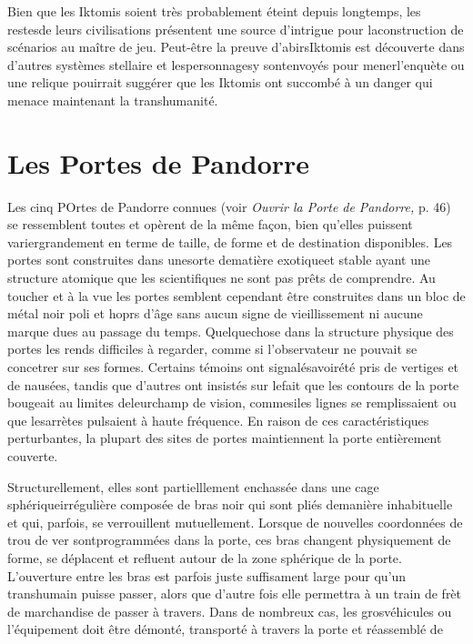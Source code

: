 Bien que les Iktomis soient très probablement éteint depuis longtemps, les restesde leurs civilisations présentent une source d'intrigue pour laconstruction de scénarios au maître de jeu. Peut-être la preuve d'abirsIktomis est découverte dans d'autres systèmes stellaire et lespersonnagesy sontenvoyés pour menerl'enquète ou une relique pouirrait suggérer que les Iktomis ont succombé à un danger qui menace maintenant la transhumanité. 

\section{Les Portes de Pandorre} 

Les cinq POrtes de Pandorre connues (voir \textit{Ouvrir la Porte de } \textit{Pandorre,} p. 46) se ressemblent toutes et opèrent de la même façon, bien qu'elles puissent variergrandement en terme de taille, de forme et de destination disponibles. Les portes sont construites dans unesorte dematière exotiqueet stable ayant une structure atomique que les scientifiques ne sont pas prêts de comprendre. Au toucher et à la vue les portes semblent cependant être construites dans un bloc de métal noir poli et hoprs d'âge sans aucun signe de vieillissement ni aucune marque dues au passage du temps. Quelquechose dans la structure physique des portes les rends difficiles à regarder, comme si l'observateur ne pouvait se concetrer sur ses formes. Certains témoins ont signalésavoirété pris de vertiges et de nausées, tandis que d'autres ont insistés sur lefait que les contours de la porte bougeait au limites deleurchamp de vision, commesiles lignes se remplissaient ou que lesarrètes pulsaient à haute fréquence. En raison de ces caractéristiques perturbantes, la plupart des sites de portes maintiennent la porte entièrement couverte. 

Structurellement, elles sont partielllement enchassée dans une cage sphériqueirrégulière composée de bras noir qui sont pliés demanière inhabituelle et qui, parfois, se verrouillent mutuellement. Lorsque de nouvelles coordonnées de trou de ver sontprogrammées dans la porte, ces bras changent physiquement de forme, se déplacent et refluent autour de la zone sphérique de la porte. L'ouverture entre les bras est parfois juste suffisament large pour qu'un transhumain puisse passer, alors que d'autre fois elle permettra à un train de frèt de marchandise de passer à travers. Dans de nombreux cas, les grosvéhicules ou l'équipement doit être démonté, transporté à travers la porte et réassemblé de 

